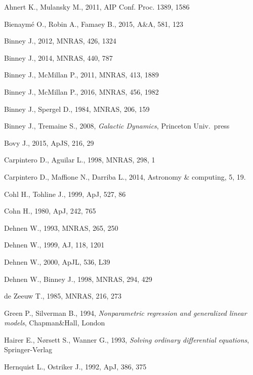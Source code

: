 \documentclass[12pt]{article}
\begin{document}
\begin{thebibliography}{99} \setlength{\parskip}{2pt} \setlength{\itemsep}{2pt}

Ahnert K., Mulansky M., 2011, AIP Conf. Proc. 1389, 1586

Bienaym\'e O., Robin A., Famaey B., 2015, A\&A, 581, 123

Binney J., 2012, MNRAS, 426, 1324

Binney J., 2014, MNRAS, 440, 787

Binney J., McMillan P., 2011, MNRAS, 413, 1889

Binney J., McMillan P., 2016, MNRAS, 456, 1982

Binney J., Spergel D., 1984, MNRAS, 206, 159

Binney J., Tremaine S., 2008, \textsl{Galactic Dynamics}, Princeton Univ.\ press

Bovy J., 2015, ApJS, 216, 29

Carpintero D., Aguilar L., 1998, MNRAS, 298, 1

Carpintero D., Maffione N., Darriba L., 2014, Astronomy \& computing, 5, 19.

Cohl H., Tohline J., 1999, ApJ, 527, 86

Cohn H., 1980, ApJ, 242, 765

Dehnen W., 1993, MNRAS, 265, 250

Dehnen W., 1999, AJ, 118, 1201

Dehnen W., 2000, ApJL, 536, L39

Dehnen W., Binney J., 1998, MNRAS, 294, 429

de Zeeuw T., 1985, MNRAS, 216, 273

Green P., Silverman B., 1994, \textsl{Nonparametric regression and generalized linear models}, Chapman\&Hall, London

Hairer E., N{\o}rsett S., Wanner G., 1993, \textsl{Solving ordinary differential equations}, Springer-Verlag

Hernquist L., Ostriker J., 1992, ApJ, 386, 375


\end{thebibliography}
\end{document}

